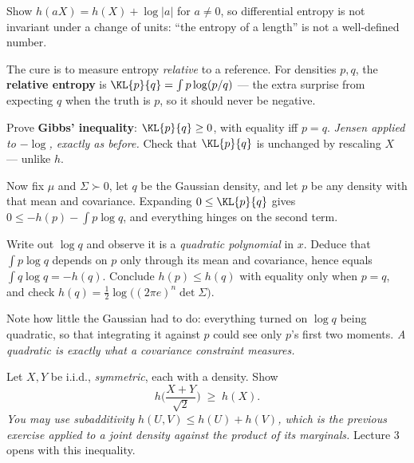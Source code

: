 \documentclass[11pt]{article}
\begin{document}
\begin{exercise}[\ty{A}]
Show $h(aX)=h(X)+\log|a|$ for $a\ne0$, so differential entropy is not invariant under a change of units: ``the entropy of a length'' is not a well-defined number.
\end{exercise}

The cure is to measure entropy \emph{relative} to a reference. For densities $p,q$, the \textbf{relative entropy} is $\KL{p}{q}=\int p\log(p/q)$ --- the extra surprise from expecting $q$ when the truth is $p$, so it should never be negative.

\begin{exercise}[\ty{B}]
Prove \textbf{Gibbs' inequality}: $\KL{p}{q}\ge0$, with equality iff $p=q$. \emph{Jensen applied to $-\log$, exactly as before.} Check that $\KL{p}{q}$ is unchanged by rescaling $X$ --- unlike $h$.
\end{exercise}

Now fix $\mu$ and $\Sigma\succ0$, let $q$ be the Gaussian density, and let $p$ be any density with that mean and covariance. Expanding $0\le\KL{p}{q}$ gives $0\le-h(p)-\int p\log q$, and everything hinges on the second term.

\begin{exercise}[\ty{B}]
Write out $\log q$ and observe it is a \emph{quadratic polynomial} in $x$. Deduce that $\int p\log q$ depends on $p$ only through its mean and covariance, hence equals $\int q\log q=-h(q)$. Conclude $h(p)\le h(q)$ with equality only when $p=q$, and check $h(q)=\tfrac12\log\big((2\pi e)^n\det\Sigma\big)$.
\end{exercise}

Note how little the Gaussian had to do: everything turned on $\log q$ being quadratic, so that integrating it against $p$ could see only $p$'s first two moments. \emph{A quadratic is exactly what a covariance constraint measures.}

\begin{exercise}[\ty{C}]
Let $X,Y$ be i.i.d., \emph{symmetric}, each with a density. Show
\[
h\Big(\frac{X+Y}{\sqrt2}\Big)\;\ge\;h(X).
\]
\emph{You may use subadditivity $h(U,V)\le h(U)+h(V)$, which is the previous exercise applied to a joint density against the product of its marginals.} Lecture 3 opens with this inequality.
\end{exercise}
\end{document}
